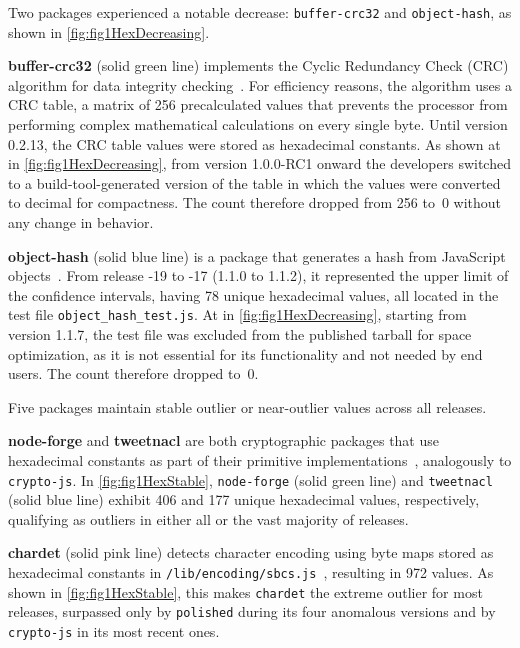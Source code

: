 Two packages experienced a notable decrease: \texttt{buffer-crc32} and \texttt{object-hash}, as shown in \cref{fig:fig1HexDecreasing}.

\textbf{buffer-crc32} (solid green line) implements the Cyclic Redundancy Check (CRC) algorithm for data integrity checking~\cite{buffer-crc32}.
For efficiency reasons, the algorithm uses a CRC table, 
a matrix of 256 precalculated values that prevents the processor from performing complex mathematical calculations on every single byte.
Until version 0.2.13, the CRC table values were stored as hexadecimal constants.
As shown at {\large{}} in \cref{fig:fig1HexDecreasing}, 
from version 1.0.0-RC1 onward the developers switched to a build-tool-generated version of the table 
in which the values were converted to decimal for compactness.
The count therefore dropped from 256 to~0 without any change in behavior.

\textbf{object-hash} (solid blue line) is a package that generates a hash from JavaScript objects~\cite{object-hash}.
From release -19 to -17 (1.1.0 to 1.1.2),
it represented the upper limit of the confidence intervals, having 78 unique hexadecimal values, 
all located in the test file \texttt{object\_hash\_test.js}.
At {\large{}} in \cref{fig:fig1HexDecreasing}, 
starting from version 1.1.7, the test file was excluded from the published tarball for space optimization, 
as it is not essential for its functionality and not needed by end users.
The count therefore dropped to~0.

Five packages maintain stable outlier or near-outlier values across all releases.

\textbf{node-forge} and \textbf{tweetnacl} are both cryptographic packages that use hexadecimal constants as part
of their primitive implementations~\cite{node-forge, tweetnacl}, analogously to \texttt{crypto-js}.
In \cref{fig:fig1HexStable}, \texttt{node-forge} (solid green line) and \texttt{tweetnacl} (solid blue line) 
exhibit 406 and 177 unique hexadecimal values, respectively, 
qualifying as outliers in either all or the vast majority of releases.

\textbf{chardet} (solid pink line) detects character encoding using byte maps stored as 
hexadecimal constants in \texttt{/lib/encoding/sbcs.js}~\cite{chardet}, resulting in 972 values.
As shown in \cref{fig:fig1HexStable},
this makes \texttt{chardet} the extreme outlier for most releases, 
surpassed only by \texttt{polished} during its four anomalous versions and by \texttt{crypto-js} in its most recent ones.

